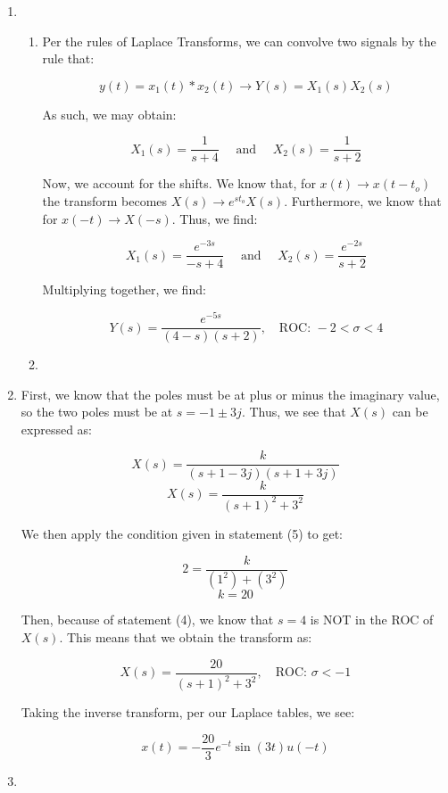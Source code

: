 \begin{enumerate}

  \item

    \begin{enumerate}

      \item Per the rules of Laplace Transforms, we can convolve two signals by the rule that:

        $$y(t)=x_1(t)*x_2(t)\to Y(s)=X_1(s)X_2(s)$$

        As such, we may obtain:

        $$X_1(s)=\frac{1}{s+4}\quad\text{ and }\quad X_2(s)=\frac{1}{s+2}$$

        Now, we account for the shifts. We know that, for $x(t)\to x(t-t_o)$ the transform becomes $X(s)\to e^{st_o}X(s)$. Furthermore, we know that for $x(-t)\to X(-s)$. Thus, we find:

        $$X_1(s)=\frac{e^{-3s}}{-s+4}\quad\text{ and }\quad X_2(s)=\frac{e^{-2s}}{s+2}$$

        Multiplying together, we find:

        $$\boxed{Y(s)=\frac{e^{-5s}}{(4-s)(s+2)},\quad\text{ROC: } -2<\sigma<4}$$

      \item 

    \end{enumerate}

  \item

    First, we know that the poles must be at plus or minus the imaginary value, so the two poles must be at $s=-1\pm 3j$. Thus, we see that $X(s)$ can be expressed as:

    $$X(s)=\frac{k}{(s+1-3j)(s+1+3j)}$$
    $$X(s)=\frac{k}{(s+1)^2+3^2}$$

    We then apply the condition given in statement (5) to get:

    $$2=\frac{k}{(1^2)+(3^2)}$$
    $$k=20$$

    Then, because of statement (4), we know that $s=4$ is NOT in the ROC of $X(s)$. This means that we obtain the transform as:

    $$\boxed{X(s)=\frac{20}{(s+1)^2+3^2},\quad\text{ROC: }\sigma <-1}$$

    Taking the inverse transform, per our Laplace tables, we see:

    $$\boxed{x(t)=-\frac{20}{3}e^{-t}\sin(3t)u(-t)}$$

  \item


\end{enumerate}
